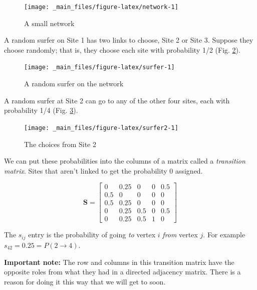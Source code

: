 \documentclass[
]{book}
\theoremstyle{definition}
\theoremstyle{definition}
\theoremstyle{definition}
\theoremstyle{definition}
\theoremstyle{remark}
\begin{document}
\begin{figure}

{\centering \texttt{[image: \_main\_files/figure-latex/network-1]} 

}

\caption{A small network}\label{fig:network}
\end{figure}

A random surfer on Site 1 has two links to choose, Site 2 or Site 3. Suppose they choose randomly; that is, they choose each site with probability 1/2 (Fig. \ref{fig:surfer}).

\begin{figure}

{\centering \texttt{[image: \_main\_files/figure-latex/surfer-1]} 

}

\caption{A random surfer on the network}\label{fig:surfer}
\end{figure}

A random surfer at Site 2 can go to any of the other four sites, each with probability 1/4 (Fig. \ref{fig:surfer2}).

\begin{figure}

{\centering \texttt{[image: \_main\_files/figure-latex/surfer2-1]} 

}

\caption{The choices from Site 2}\label{fig:surfer2}
\end{figure}

We can put these probabilities into the columns of a matrix called a \emph{transition matrix}. Sites that aren't linked to get the probability 0 assigned.

\[\mathbf{S}=\begin{bmatrix}0 & 0.25 & 0 & 0 & 0.5\\
0.5 & 0 & 0 & 0 & 0\\
0.5 & 0.25 & 0 & 0 & 0\\
0 & 0.25 & 0.5 & 0 & 0.5\\
0 & 0.25 & 0.5 & 1 & 0\end{bmatrix}
\]

The \(s_{ij}\) entry is the probability of going \emph{to} vertex \(i\) \emph{from} vertex \(j\). For example \(s_{42}=0.25=P(2\to 4)\).

\begin{notebox}
\textbf{Important note:} The row and columns in this transition matrix have the opposite roles from what they had in a directed adjacency matrix. There is a reason for doing it this way that we will get to soon.

\end{notebox}
\end{document}
